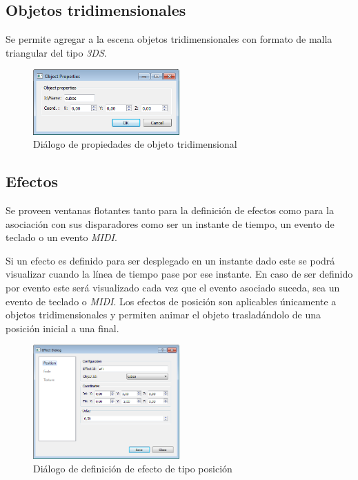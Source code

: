 \subsection{Objetos tridimensionales}

Se permite agregar a la escena objetos tridimensionales con formato de malla triangular del tipo \emph{3DS}.

\begin{figure}[H]
  \centering
    \includegraphics[width=0.5\textwidth]{./Cap5_vmt/vmt_objectProperties.png}
  \caption{Diálogo de propiedades de objeto tridimensional}
  \label{fig:VMT-ObjectProperties}
\end{figure}

\subsection{Efectos}

Se proveen ventanas flotantes tanto para la definición de efectos como para la asociación con sus disparadores como ser un instante de tiempo, un evento de teclado o un evento \emph{MIDI}.

Si un efecto es definido para ser desplegado en un instante dado este se podrá visualizar cuando la línea de tiempo pase por ese instante. En caso de ser definido por evento este será visualizado cada vez que el evento asociado suceda, sea un evento de teclado o \emph{MIDI}.
Los efectos de posición son aplicables únicamente a objetos tridimensionales y permiten animar el objeto trasladándolo de una posición inicial a una final.

\begin{figure}[H]
  \centering
    \includegraphics[width=0.5\textwidth]{./Cap5_vmt/vmt_EfectDialog1.png}
  \caption{Diálogo de definición de efecto de tipo posición}
  \label{fig:VMT-EffectPossition}
\end{figure}

